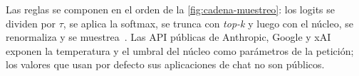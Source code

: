 \addtocounter{definicion}{1}%

\begin{observacion}
Las reglas se componen en el orden de la \cref{fig:cadena-muestreo}: los logits se dividen por $\tau$, se aplica la softmax, se trunca con \emph{top-k} y luego con el núcleo, se renormaliza y se muestrea~\cite[§7.6.4]{jm3}. Las API públicas de Anthropic, Google y xAI exponen la temperatura y el umbral del núcleo como parámetros de la petición; los valores que usan por defecto sus aplicaciones de chat no son públicos.
\end{observacion}

\addtocounter{figure}{1}%

